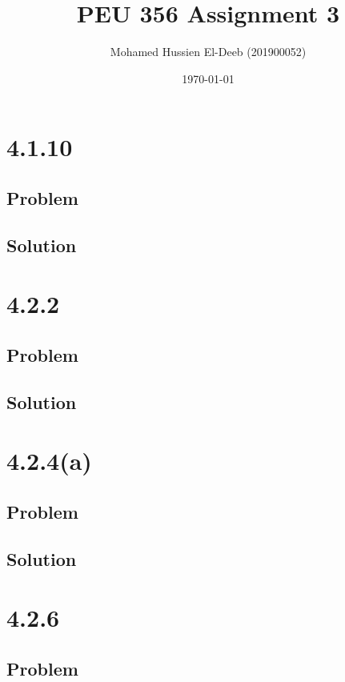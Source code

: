\documentclass[12pt]{article}
\title{PEU 356 Assignment 3}
\author{Mohamed Hussien El-Deeb (201900052)}
\date{\today}
\begin{document}
\maketitle
\tableofcontents
\hypersetup{linkcolor=RoyalBlue4}

\newpage
\section{4.1.10}

\subsection{Problem}

\subsection{Solution}

\newpage
\section{4.2.2}

\subsection{Problem}

\subsection{Solution}

\newpage
\section{4.2.4(a)}

\subsection{Problem}

\subsection{Solution}

\newpage
\section{4.2.6}

\subsection{Problem}
\end{document}

